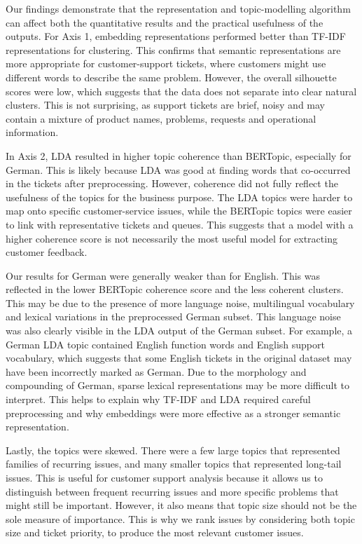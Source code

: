 \documentclass[11pt]{article}
\begin{document}
Our findings demonstrate that the representation and topic-modelling algorithm can affect both the quantitative results and the practical usefulness of the outputs. For Axis 1, embedding representations performed better than TF-IDF representations for clustering. This confirms that semantic representations are more appropriate for customer-support tickets, where customers might use different words to describe the same problem. However, the overall silhouette scores were low, which suggests that the data does not separate into clear natural clusters. This is not surprising, as support tickets are brief, noisy and may contain a mixture of product names, problems, requests and operational information.



In Axis 2, LDA resulted in higher topic coherence than BERTopic, especially for German. This is likely because LDA was good at finding words that co-occurred in the tickets after preprocessing. However, coherence did not fully reflect the usefulness of the topics for the business purpose. The LDA topics were harder to map onto specific customer-service issues, while the BERTopic topics were easier to link with representative tickets and queues. This suggests that a model with a higher coherence score is not necessarily the most useful model for extracting customer feedback.

Our results for German were generally weaker than for English. This was reflected in the lower BERTopic coherence score and the less coherent clusters. This may be due to the presence of more language noise, multilingual vocabulary and lexical variations in the preprocessed German subset. This language noise was also clearly visible in the LDA output of the German subset. For example, a German LDA topic contained English function words and English support vocabulary, which suggests that some English tickets in the original dataset may have been incorrectly marked as German. Due to the morphology and compounding of German, sparse lexical representations may be more difficult to interpret. This helps to explain why TF-IDF and LDA required careful preprocessing and why embeddings were more effective as a stronger semantic representation.

Lastly, the topics were skewed. There were a few large topics that represented families of recurring issues, and many smaller topics that represented long-tail issues. This is useful for customer support analysis because it allows us to distinguish between frequent recurring issues and more specific problems that might still be important. However, it also means that topic size should not be the sole measure of importance. This is why we rank issues by considering both topic size and ticket priority, to produce the most relevant customer issues.
\end{document}

